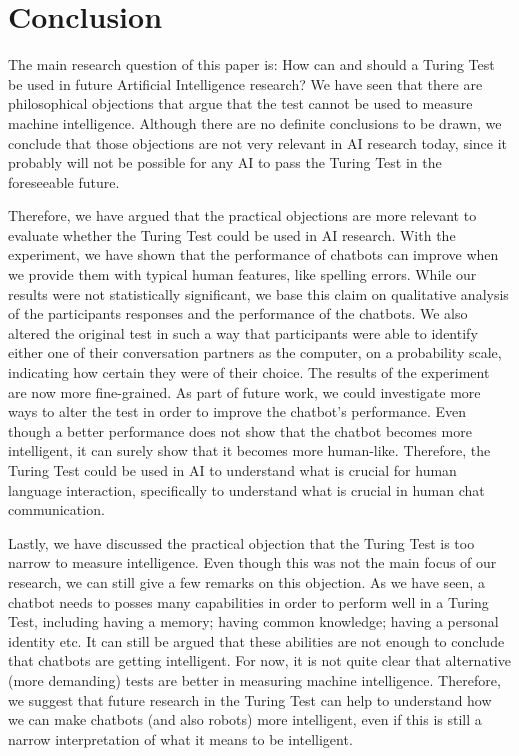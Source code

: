 \section{Conclusion}
The main research question of this paper is: How can and should a Turing Test be used in future Artificial Intelligence research? We have seen that there are philosophical objections that argue that the test cannot be used to measure machine intelligence. Although there are no definite conclusions to be drawn, we conclude that those objections are not very relevant in AI research today, since it probably will not be possible for any AI to pass the Turing Test in the foreseeable future.

Therefore, we have argued that the practical objections are more relevant to evaluate whether the Turing Test could be used in AI research. With the experiment, we have shown that the performance of chatbots can improve when we provide them with typical human features, like spelling errors. While our results were not statistically significant, we base this claim on qualitative analysis of the participants responses and the performance of the chatbots. We also altered the original test in such a way that participants were able to identify either one of their conversation partners as the computer, on a probability scale, indicating how certain they were of their choice. The results of the experiment are now more fine-grained. As part of future work, we could investigate more ways to alter the test in order to improve the chatbot’s performance. Even though a better performance does not show that the chatbot becomes more intelligent, it can surely show that it becomes more human-like. Therefore, the Turing Test could be used in AI to understand what is crucial for human language interaction, specifically to understand what is crucial in human chat communication.

Lastly, we have discussed the practical objection that the Turing Test is too narrow to measure intelligence. Even though this was not the main focus of our research, we can still give a few remarks on this objection. As we have seen, a chatbot needs to posses many capabilities in order to perform well in a Turing Test, including having a memory; having common knowledge; having a personal identity etc. It can still be argued that these abilities are not enough to conclude that chatbots are getting intelligent. For now, it is not quite clear that alternative (more demanding) tests are better in measuring machine intelligence. Therefore, we suggest that future research in the Turing Test can help to understand how we can make chatbots (and also robots) more intelligent, even if this is still a narrow interpretation of what it means to be intelligent.
